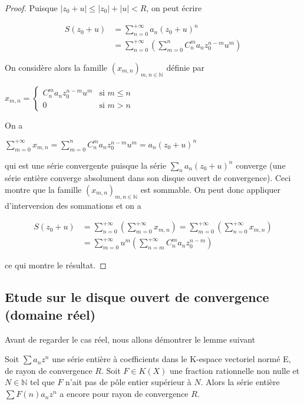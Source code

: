 \begin{proof}
Puisque $|z_0 + u| \leq |z_0| + |u| < R$, on peut écrire

\begin{align*}
S(z_0 + u) &= \sum_{n=0}^{+\infty} a_n (z_0 + u)^n \\
&= \sum_{n=0}^{+\infty} \left(\sum_{m=0}^n C_n^m a_n z_0^{n-m} u^m \right)
\end{align*}

On considère alors la famille $(x_{m,n})_{m,n\in\mathbb{N}}$ définie par

$x_{m,n} = \begin{cases} C_n^m a_n z_0^{n-m} u^m & \text{si } m \leq n \\ 0 & \text{si } m > n \end{cases}$

On a

$\sum_{m=0}^{+\infty} x_{m,n} = \sum_{m=0}^n C_n^m a_n z_0^{n-m} u^m = a_n (z_0 + u)^n$

qui est une série convergente puisque la série $\sum_n a_n (z_0 + u)^n$ converge (une série entière converge absolument dans son disque ouvert de convergence). Ceci montre que la famille $(x_{m,n})_{m,n\in\mathbb{N}}$ est sommable. On peut donc appliquer d'interversion des sommations et on a

\begin{align*}
S(z_0 + u) &= \sum_{n=0}^{+\infty} \left(\sum_{m=0}^{+\infty} x_{m,n}\right) = \sum_{m=0}^{+\infty} \left(\sum_{n=0}^{+\infty} x_{m,n}\right) \\
&= \sum_{m=0}^{+\infty} u^m \left(\sum_{n=m}^{+\infty} C_n^m a_n z_0^{n-m}\right)
\end{align*}

ce qui montre le résultat.
\end{proof}

\subsection{Etude sur le disque ouvert de convergence (domaine réel)}

Avant de regarder le cas réel, nous allons démontrer le lemme suivant

\begin{lem}
Soit $\sum a_n z^n$ une série entière à coefficients dans le K-espace vectoriel normé E, de rayon de convergence $R$. Soit $F \in K(X)$ une fraction rationnelle non nulle et $N \in \mathbb{N}$ tel que $F$ n'ait pas de pôle entier supérieur à $N$. Alors la série entière $\sum F(n) a_n z^n$ a encore pour rayon de convergence $R$.
\end{lem}

